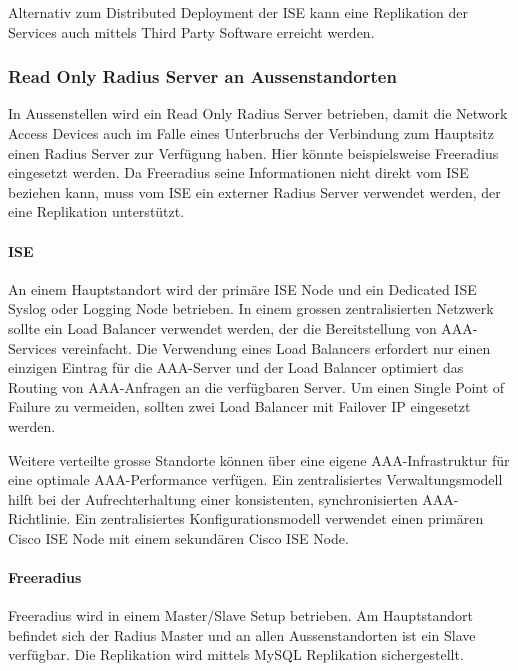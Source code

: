 Alternativ zum Distributed Deployment der ISE kann eine Replikation der Services auch mittels Third Party Software erreicht werden. 

\subsubsection{Read Only Radius Server an Aussenstandorten}

In Aussenstellen wird ein Read Only Radius Server betrieben, damit die Network Access Devices auch im Falle eines Unterbruchs der Verbindung zum Hauptsitz einen Radius Server zur Verfügung haben. Hier könnte beispielsweise Freeradius eingesetzt werden. Da Freeradius seine Informationen nicht direkt vom ISE beziehen kann, muss vom ISE ein externer Radius Server verwendet werden, der eine Replikation unterstützt. 

\paragraph{ISE}
An einem Hauptstandort wird der primäre ISE Node und ein Dedicated ISE Syslog oder Logging Node betrieben. In einem grossen zentralisierten Netzwerk sollte ein Load Balancer verwendet werden, der die Bereitstellung von AAA-Services vereinfacht. Die Verwendung eines Load Balancers erfordert nur einen einzigen Eintrag für die AAA-Server und der Load Balancer optimiert das Routing von AAA-Anfragen an die verfügbaren Server. Um einen Single Point of Failure zu vermeiden, sollten zwei Load Balancer mit Failover IP eingesetzt werden.

Weitere verteilte grosse Standorte können über eine eigene AAA-Infrastruktur für eine optimale AAA-Performance verfügen. Ein zentralisiertes Verwaltungsmodell hilft bei der Aufrechterhaltung einer konsistenten, synchronisierten AAA-Richtlinie. Ein zentralisiertes Konfigurationsmodell verwendet einen primären Cisco ISE Node mit einem sekundären Cisco ISE Node. 

\paragraph{Freeradius}

Freeradius wird in einem Master/Slave Setup betrieben. Am Hauptstandort befindet sich der Radius Master und an allen Aussenstandorten ist ein Slave verfügbar. Die Replikation wird mittels MySQL Replikation sichergestellt.

